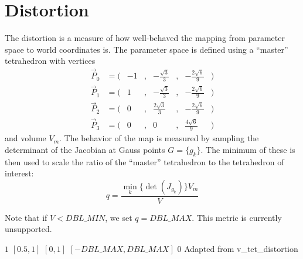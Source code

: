 \section{Distortion}

The distortion is a measure of how well-behaved the mapping from
parameter space to world coordinates is.
The parameter space is defined using a ``master'' tetrahedron
with vertices
\[
\begin{array}{lcrcrcrc}
 \vec P_0 &= (& -1&,& -\frac{ \sqrt{3}}{3}&,& -\frac{2\sqrt{6}}{9}&)\\
 \vec P_1 &= (&  1&,& -\frac{ \sqrt{3}}{3}&,& -\frac{2\sqrt{6}}{9}&)\\
 \vec P_2 &= (&  0&,&  \frac{2\sqrt{3}}{3}&,& -\frac{2\sqrt{6}}{9}&)\\
 \vec P_3 &= (&  0&,&                    0&,&  \frac{4\sqrt{6}}{9}&)
\end{array}
\]
and volume $V_m$.
The behavior of the map is measured by sampling the determinant of the
Jacobian at Gauss points $G = \{g_k\}$.
The minimum of these is then used to scale the ratio of the
``master'' tetrahedron to the tetrahedron of interest:
\[
q = \frac{\min_k\{\det(J_{g_k})\} V_m}{V}
\]

Note that if $V < DBL\_MIN$, we set $q = DBL\_MAX$.
This metric is currently unsupported.

%
{$1$}%
{$[0.5,1]$}%
{$[0,1]$}%
{$[-DBL\_MAX,DBL\_MAX]$}%
{$0$}%
{Adapted from \cite{ideas:xx}}%
{v\_tet\_distortion}%


